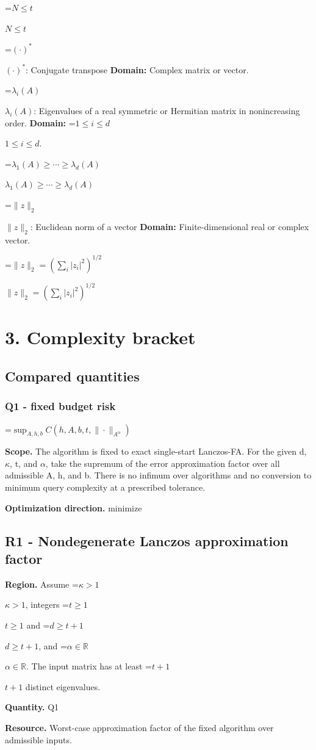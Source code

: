 \documentclass[10pt,a4paper]{article}
\newcommand{\AtlasMath}[1]{\par\begingroup\centering\setbox0=\hbox{$\displaystyle #1$}\ifdim\wd0>1.4\linewidth\typeout{ATLAS WIDE FORMULA: \the\wd0}\fi\ifdim\wd0>\linewidth\resizebox{\linewidth}{!}{\box0}\else\box0\fi\par\endgroup}
\newcommand{\AtlasInlineMath}[1]{\begingroup\setbox0=\hbox{$#1$}\ifdim\wd0>.4\linewidth\endgroup\AtlasMath{#1}\else\endgroup$#1$\fi}
\begin{document}
\AtlasInlineMath{N\le t}

\AtlasInlineMath{(\cdot)^*}: Conjugate transpose \textbf{Domain:} Complex matrix or vector.

\AtlasInlineMath{\lambda_i(A)}: Eigenvalues of a real symmetric or Hermitian matrix in nonincreasing order. \textbf{Domain:} \AtlasInlineMath{1\le i\le d}.

\AtlasInlineMath{\lambda_1(A)\ge\cdots\ge\lambda_d(A)}

\AtlasInlineMath{\|z\|_2}: Euclidean norm of a vector \textbf{Domain:} Finite-dimensional real or complex vector.

\AtlasInlineMath{\|z\|_2=(\sum_i|z_i|^2)^{1/2}}

\section{3. Complexity bracket}
\subsection{Compared quantities}
\subsubsection{Q1 - fixed budget risk}
\AtlasMath{\sup_{A,h,b}C\!\left(h,A,b,t,\|\cdot\|_{A^\alpha}\right)}
\textbf{Scope.} The algorithm is fixed to exact single-start Lanczos-FA. For the given d, $\kappa$, t, and $\alpha$, take the supremum of the error approximation factor over all admissible A, h, and b. There is no infimum over algorithms and no conversion to minimum query complexity at a prescribed tolerance.

\textbf{Optimization direction.} minimize

\subsection{R1 - Nondegenerate Lanczos approximation factor}
\textbf{Region.} Assume \AtlasInlineMath{\kappa>1}, integers \AtlasInlineMath{t\ge1} and \AtlasInlineMath{d\ge t+1}, and \AtlasInlineMath{\alpha\in\mathbb{R}}. The input matrix has at least \AtlasInlineMath{t+1} distinct eigenvalues.

\textbf{Quantity.} Q1

\textbf{Resource.} Worst-case approximation factor of the fixed algorithm over admissible inputs.
\end{document}
